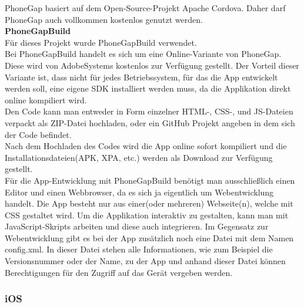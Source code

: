 PhoneGap basiert auf dem Open-Source-Projekt Apache Cordova. Daher darf PhoneGap auch vollkommen kostenlos genutzt werden.\\
\textbf{PhoneGapBuild}\\
Für dieses Projekt wurde PhoneGapBuild verwendet.\\
Bei PhoneGapBuild handelt es sich um eine Online-Variante von PhoneGap. Diese wird von AdobeSystems kostenlos zur Verfügung gestellt. Der Vorteil dieser Variante ist, dass nicht für jedes Betriebssystem, für das die App entwickelt werden soll, eine eigene SDK installiert werden muss, da die Applikation direkt online kompiliert wird.\\
Den Code kann man entweder in Form einzelner HTML-, CSS-, und JS-Dateien verpackt als ZIP-Datei hochladen, oder ein GitHub Projekt angeben in dem sich der Code befindet.\\
Nach dem Hochladen des Codes wird die App online sofort kompiliert und die Installationsdateien(APK, XPA, etc.) werden als Download zur Verfügung gestellt.\\

Für die App-Entwicklung mit PhoneGapBuild benötigt man ausschließlich einen Editor und einen Webbrowser, da es sich ja eigentlich um Webentwicklung handelt. Die App besteht nur aus einer(oder mehreren) Webseite(n), welche mit CSS gestaltet wird. Um die Applikation interaktiv zu gestalten, kann man mit JavaScript-Skripts arbeiten und diese auch integrieren. Im Gegensatz zur Webentwicklung gibt es bei der App zusätzlich noch eine Datei mit dem Namen config.xml. In dieser Datei stehen alle Informationen, wie zum Beispiel die Versionsnummer oder der Name, zu der App und anhand dieser Datei können Berechtigungen für den Zugriff auf das Gerät vergeben werden.\\

\subsubsection{iOS}

